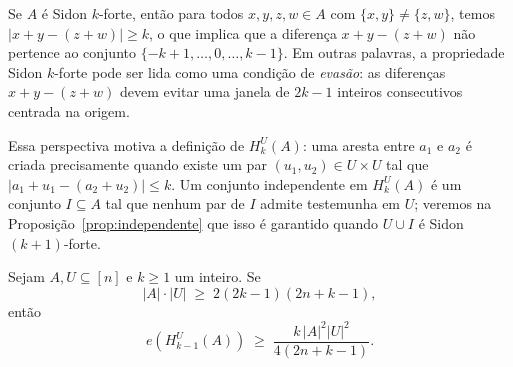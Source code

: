 \documentclass[reqno,a4paper,12pt]{amsart}
\begin{document}
\begin{observation}
  Se $A$ é Sidon $k$-forte, então para todos $x,y,z,w \in A$ com $\{x,y\} \neq \{z,w\}$, temos
  $|x+y-(z+w)| \geq k$, o que implica que a diferença $x+y-(z+w)$ não pertence ao conjunto
  $\{-k+1, \ldots, 0, \ldots, k-1\}$. Em outras palavras, a propriedade Sidon $k$-forte pode ser
  lida como uma condição de \emph{evasão}: as diferenças $x+y-(z+w)$ devem evitar uma janela de
  $2k-1$ inteiros consecutivos centrada na origem.

  Essa perspectiva motiva a definição de $H_k^U(A)$: uma aresta entre $a_1$ e $a_2$ é criada
  precisamente quando existe um par $(u_1,u_2) \in U \times U$ tal que $|a_1+u_1-(a_2+u_2)| \leq k$.
  Um conjunto independente em $H_k^U(A)$ é um conjunto $I \subseteq A$ tal que nenhum par de $I$
  admite testemunha em $U$; veremos na Proposição~\ref{prop:independente} que isso é
  garantido quando $U \cup I$ é Sidon $(k+1)$-forte.
\end{observation}

\begin{lemma}\label{lem:supersaturacao}
  Sejam $A, U \subseteq [n]$ e $k \geq 1$ um inteiro. Se
  \[
    |A| \cdot |U| \;\geq\; 2(2k-1)(2n+k-1),
  \]
  então
  \[
    e(H_{k-1}^U(A)) \;\geq\; \frac{k\,|A|^2|U|^2}{4(2n+k-1)}.
  \]
\end{lemma}
\end{document}
